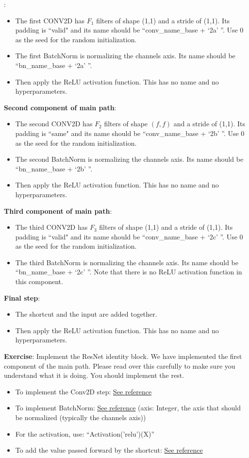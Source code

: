 : 
\begin{itemize}
\item The first CONV2D has $F_1$ filters of shape (1,1) and a stride of (1,1). Its padding is ``valid" and its name should be ``conv\_name\_base + `2a' ''. Use 0 as the seed for the random initialization. 
\item The first BatchNorm is normalizing the channels axis.  Its name should be ``bn\_name\_base + `2a' ''.
\item Then apply the ReLU activation function. This has no name and no hyperparameters. 
\end{itemize}
{\textbf{Second component of main path}}:
\begin{itemize}
\item The second CONV2D has $F_2$ filters of shape $(f,f)$ and a stride of (1,1). Its padding is ``same" and its name should be ``conv\_name\_base + `2b' ''. Use 0 as the seed for the random initialization. 
\item The second BatchNorm is normalizing the channels axis.  Its name should be ``bn\_name\_base + `2b' ''.
\item Then apply the ReLU activation function. This has no name and no hyperparameters. 
\end{itemize}
{\textbf{Third component of main path}}:
\begin{itemize}
\item The third CONV2D has $F_3$ filters of shape (1,1) and a stride of (1,1). Its padding is ``valid" and its name should be ``conv\_name\_base + `2c' ''. Use 0 as the seed for the random initialization. 
\item The third BatchNorm is normalizing the channels axis.  Its name should be ``bn\_name\_base +  `2c' ''. Note that there is no ReLU activation function in this component. 
\end{itemize}
{\textbf{Final step}}: 
\begin{itemize}
\item The shortcut and the input are added together.
\item Then apply the ReLU activation function. This has no name and no hyperparameters. 
\end{itemize}

{\textbf{Exercise}}: Implement the ResNet identity block. We have implemented the first component of the main path. Please read over this carefully to make sure you understand what it is doing. You should implement the rest. 
\begin{itemize}
\item To implement the Conv2D step: \href{https://keras.io/layers/convolutional/#conv2d}{See reference}
\item To implement BatchNorm: \href{https://faroit.github.io/keras-docs/1.2.2/layers/normalization/}{See reference} (axis: Integer, the axis that should be normalized (typically the channels axis))
\item For the activation, use:  ``Activation('relu')(X)''
\item To add the value passed forward by the shortcut: \href{https://keras.io/layers/merge/#add}{See reference}
\end{itemize}

